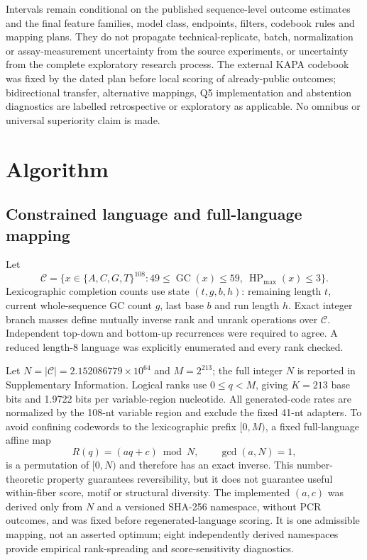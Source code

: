 \documentclass[unnumsec,webpdf,modern,large]{oup-authoring-template}
\newcommand{\DNA}{\{A,C,G,T\}}
\begin{document}
Intervals remain conditional on the published sequence-level outcome estimates and the final feature families, model class, endpoints, filters, codebook rules and mapping plans. They do not propagate technical-replicate, batch, normalization or assay-measurement uncertainty from the source experiments, or uncertainty from the complete exploratory research process. The external KAPA codebook was fixed by the dated plan before local scoring of already-public outcomes; bidirectional transfer, alternative mappings, Q5 implementation and abstention diagnostics are labelled retrospective or exploratory as applicable. No omnibus or universal superiority claim is made.

\section{Algorithm}

\subsection{Constrained language and full-language mapping}

Let
\[
 \mathcal C=\{x\in\DNA^{108}:49\leq\operatorname{GC}(x)\leq59,\ 
 \operatorname{HP}_{\max}(x)\leq3\}.
\]
Lexicographic completion counts use state $(t,g,b,h)$: remaining length $t$, current whole-sequence GC count $g$, last base $b$ and run length $h$. Exact integer branch masses define mutually inverse rank and unrank operations over $\mathcal C$. Independent top-down and bottom-up recurrences were required to agree. A reduced length-8 language was explicitly enumerated and every rank checked.

Let $N=|\mathcal C|=2.152086779\times10^{64}$ and $M=2^{213}$; the full integer $N$ is reported in Supplementary Information. Logical ranks use $0\leq q<M$, giving $K=213$ base bits and 1.9722 bits per variable-region nucleotide. All generated-code rates are normalized by the 108-nt variable region and exclude the fixed 41-nt adapters. To avoid confining codewords to the lexicographic prefix $[0,M)$, a fixed full-language affine map
\[
 R(q)=(aq+c)\bmod N,\qquad \gcd(a,N)=1,
\]
is a permutation of $[0,N)$ and therefore has an exact inverse. This number-theoretic property guarantees reversibility, but it does not guarantee useful within-fiber score, motif or structural diversity. The implemented $(a,c)$ was derived only from $N$ and a versioned SHA-256 namespace, without PCR outcomes, and was fixed before regenerated-language scoring. It is one admissible mapping, not an asserted optimum; eight independently derived namespaces provide empirical rank-spreading and score-sensitivity diagnostics.
\end{document}
